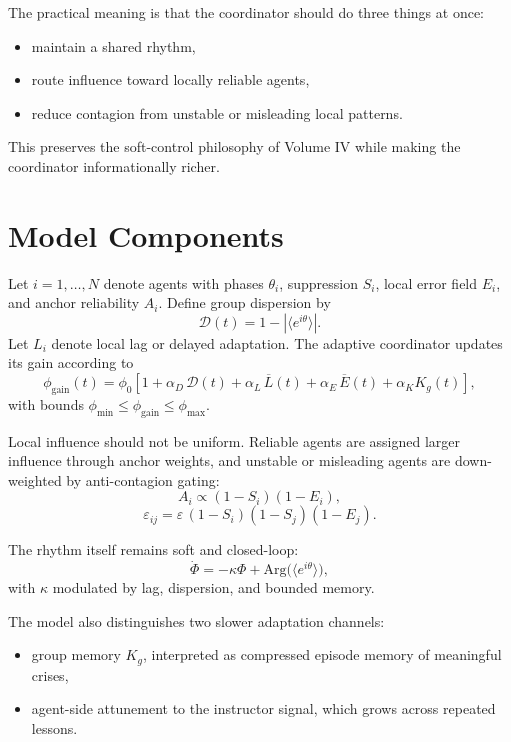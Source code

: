 \documentclass[12pt,a4paper]{article}
\begin{document}
The practical meaning is that the coordinator should do three things at once:
\begin{itemize}
    \item maintain a shared rhythm,
    \item route influence toward locally reliable agents,
    \item reduce contagion from unstable or misleading local patterns.
\end{itemize}

This preserves the soft-control philosophy of Volume IV while making the coordinator informationally richer.

\section{Model Components}
Let $i=1,\dots,N$ denote agents with phases $\theta_i$, suppression $S_i$, local error field $E_i$, and anchor reliability $A_i$. Define group dispersion by
\begin{equation}
\mathcal{D}(t)=1-\left|\langle e^{i\theta}\rangle\right|.
\end{equation}
Let $L_i$ denote local lag or delayed adaptation. The adaptive coordinator updates its gain according to
\begin{equation}
\phi_{\mathrm{gain}}(t)=\phi_0\left[1+\alpha_D\,\mathcal{D}(t)+\alpha_L\,\overline{L}(t)+\alpha_E\,\overline{E}(t)+\alpha_K K_g(t)\right],
\end{equation}
with bounds $\phi_{\min}\le\phi_{\mathrm{gain}}\le\phi_{\max}$.

Local influence should not be uniform. Reliable agents are assigned larger influence through anchor weights, and unstable or misleading agents are down-weighted by anti-contagion gating:
\begin{equation}
A_i \propto (1-S_i)(1-E_i),
\end{equation}
\begin{equation}
\varepsilon_{ij}=\varepsilon\,(1-S_i)(1-S_j)(1-E_j).
\end{equation}

The rhythm itself remains soft and closed-loop:
\begin{equation}
\dot{\Phi}=-\kappa\Phi + \mathrm{Arg}\big(\langle e^{i\theta}\rangle\big),
\end{equation}
with $\kappa$ modulated by lag, dispersion, and bounded memory.

The model also distinguishes two slower adaptation channels:
\begin{itemize}
    \item group memory $K_g$, interpreted as compressed episode memory of meaningful crises,
    \item agent-side attunement to the instructor signal, which grows across repeated lessons.
\end{itemize}
\end{document}
